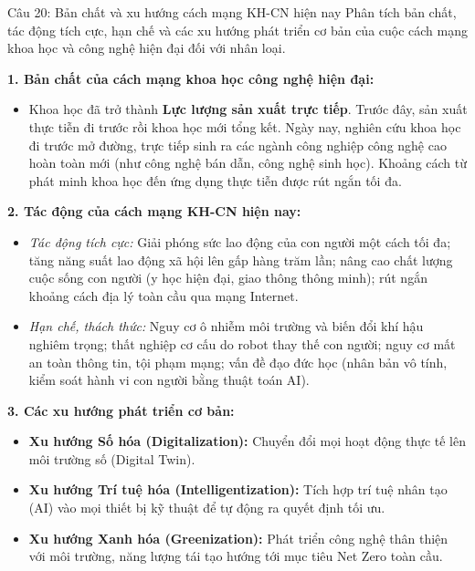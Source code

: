 \documentclass[12pt,a4paper]{article}
\begin{document}
{\begin{questionbox}{Câu 20: Bản chất và xu hướng cách mạng KH-CN hiện nay}
Phân tích bản chất, tác động tích cực, hạn chế và các xu hướng phát triển cơ bản của cuộc cách mạng khoa học và công nghệ hiện đại đối với nhân loại.
\end{questionbox}

\noindent
\textbf{1. Bản chất của cách mạng khoa học công nghệ hiện đại:}
\begin{itemize}
    \item Khoa học đã trở thành \textbf{Lực lượng sản xuất trực tiếp}. Trước đây, sản xuất thực tiễn đi trước rồi khoa học mới tổng kết. Ngày nay, nghiên cứu khoa học đi trước mở đường, trực tiếp sinh ra các ngành công nghiệp công nghệ cao hoàn toàn mới (như công nghệ bán dẫn, công nghệ sinh học). Khoảng cách từ phát minh khoa học đến ứng dụng thực tiễn được rút ngắn tối đa.
\end{itemize}

\noindent
\textbf{2. Tác động của cách mạng KH-CN hiện nay:}
\begin{itemize}
    \item \textit{Tác động tích cực:} Giải phóng sức lao động của con người một cách tối đa; tăng năng suất lao động xã hội lên gấp hàng trăm lần; nâng cao chất lượng cuộc sống con người (y học hiện đại, giao thông thông minh); rút ngắn khoảng cách địa lý toàn cầu qua mạng Internet.
    \item \textit{Hạn chế, thách thức:} Nguy cơ ô nhiễm môi trường và biến đổi khí hậu nghiêm trọng; thất nghiệp cơ cấu do robot thay thế con người; nguy cơ mất an toàn thông tin, tội phạm mạng; vấn đề đạo đức học (nhân bản vô tính, kiểm soát hành vi con người bằng thuật toán AI).
\end{itemize}

\noindent
\textbf{3. Các xu hướng phát triển cơ bản:}
\begin{itemize}
    \item \textbf{Xu hướng Số hóa (Digitalization):} Chuyển đổi mọi hoạt động thực tế lên môi trường số (Digital Twin).
    \item \textbf{Xu hướng Trí tuệ hóa (Intelligentization):} Tích hợp trí tuệ nhân tạo (AI) vào mọi thiết bị kỹ thuật để tự động ra quyết định tối ưu.
    \item \textbf{Xu hướng Xanh hóa (Greenization):} Phát triển công nghệ thân thiện với môi trường, năng lượng tái tạo hướng tới mục tiêu Net Zero toàn cầu.
\end{itemize}

}
\end{document}

